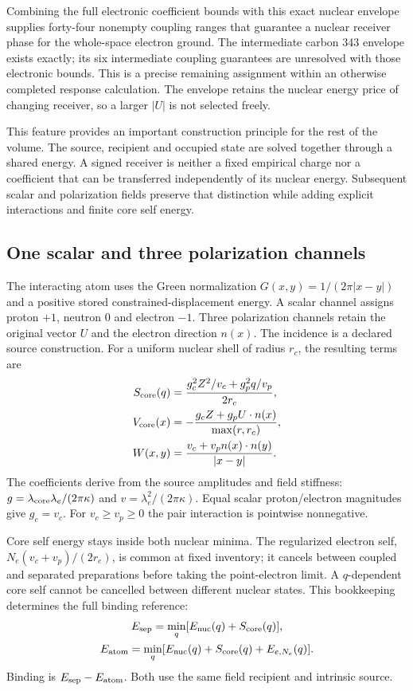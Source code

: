 Combining the full electronic coefficient bounds with this exact nuclear envelope supplies forty-four nonempty coupling ranges that guarantee a nuclear receiver phase for the whole-space electron ground. The intermediate carbon 343 envelope exists exactly; its six intermediate coupling guarantees are unresolved with those electronic bounds. This is a precise remaining assignment within an otherwise completed response calculation. The envelope retains the nuclear energy price of changing receiver, so a larger $|U|$ is not selected freely.

This feature provides an important construction principle for the rest of the volume. The source, recipient and occupied state are solved together through a shared energy. A signed receiver is neither a fixed empirical charge nor a coefficient that can be transferred independently of its nuclear energy. Subsequent scalar and polarization fields preserve that distinction while adding explicit interactions and finite core self energy.

\subsection{One scalar and three polarization channels}

The interacting atom uses the Green normalization $G(x,y)=1/(2\pi|x-y|)$ and a positive stored constrained-displacement energy. A scalar channel assigns proton $+1$, neutron $0$ and electron $-1$. Three polarization channels retain the original vector $U$ and the electron direction $n(x)$. The incidence is a declared source construction. For a uniform nuclear shell of radius $r_c$, the resulting terms are
\begin{align*}
 S_{\rm core}(q)&=\frac{g_c^2Z^2/v_c+g_p^2q/v_p}{2r_c},\\
 V_{\rm core}(x)&=-\frac{g_cZ+g_pU\cdot n(x)}{\max(r,r_c)},\\
 W(x,y)&=\frac{v_c+v_p n(x)\cdot n(y)}{|x-y|}.
\end{align*}
The coefficients derive from the source amplitudes and field stiffness: $g=\lambda_{\rm core}\lambda_e/(2\pi\kappa)$ and $v=\lambda_e^2/(2\pi\kappa)$. Equal scalar proton/electron magnitudes give $g_c=v_c$. For $v_c\geq v_p\geq0$ the pair interaction is pointwise nonnegative. 

Core self energy stays inside both nuclear minima. The regularized electron self, $N_e(v_c+v_p)/(2r_e)$, is common at fixed inventory; it cancels between coupled and separated preparations before taking the point-electron limit. A $q$-dependent core self cannot be cancelled between different nuclear states. This bookkeeping determines the full binding reference:
\[
\begin{gathered}
E_{\rm sep}=\min_q[E_{\rm nuc}(q)+S_{\rm core}(q)],\\
 E_{\rm atom}=\min_q[E_{\rm nuc}(q)+S_{\rm core}(q)+E_{e,N_e}(q)].
\end{gathered}
\]
Binding is $E_{\rm sep}-E_{\rm atom}$. Both use the same field recipient and intrinsic source.

